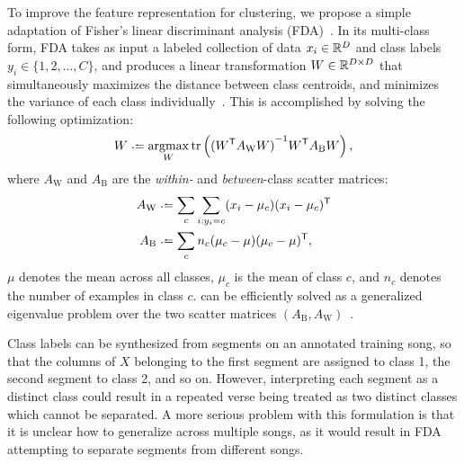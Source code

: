 \documentclass{article}
\begin{document}
\label{sec:olda}
To improve the feature representation for clustering, we propose a simple adaptation of Fisher's linear discriminant
analysis (FDA)~\cite{fisher1936use}.  In its multi-class form, FDA takes as input a labeled collection of data $x_i \in \mathbb{R}^D$
and class labels $y_i \in \{1,2,\ldots, C\}$, and produces a linear transformation $W \in \mathbb{R}^{D\times D}$ that simultaneously 
maximizes the distance between class centroids, and minimizes the variance of each class 
individually~\cite{fukunaga1990introduction}. This is accomplished by solving the following optimization:
\begin{equation}
W \defeq \argmax_W \trace\left( {(W\trans A_\text{W} W)}^{-1} W\trans A_\text{B} W \right) \label{eq:fda},
\end{equation}
where $A_\text{W}$ and $A_\text{B}$ are the \emph{within-} and \emph{between}-class scatter matrices:
\begin{align*}
A_\text{W} & \defeq \sum_c \sum_{i : y_i = c} (x_i - \mu_c)(x_i - \mu_c)\trans\\
A_\text{B} & \defeq \sum_c n_c (\mu_c - \mu)(\mu_c - \mu)\trans,
\end{align*}
$\mu$ denotes the mean across all classes, $\mu_c$ is the mean of class $c$, and $n_c$ denotes the number of examples in class $c$.
 can be efficiently solved as a generalized eigenvalue problem over the two scatter matrices $(A_\text{B},
A_\text{W})$~\cite{de2005eigenproblems}.

Class labels can be synthesized from segments on an annotated training song, so that the columns of $X$ belonging to the first 
segment are assigned to class 1, the second segment to class 2, and so on.
However, interpreting each segment as a distinct class could result in a repeated verse being treated as two distinct classes which 
cannot be separated. 
A more serious problem with this formulation is that it is unclear how to generalize across multiple songs, as it would result in
FDA attempting to separate segments from different songs.%
\end{document}
